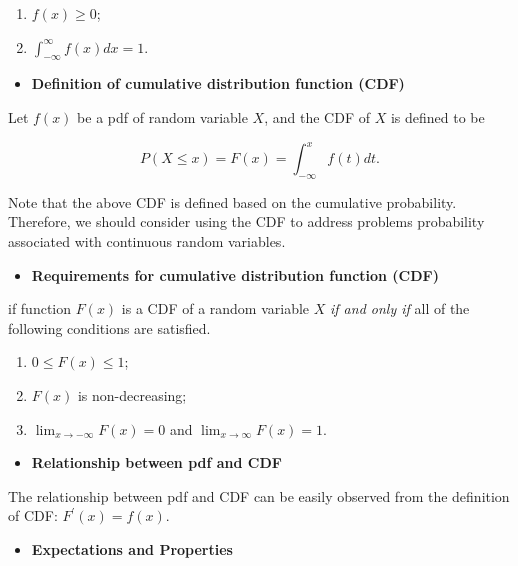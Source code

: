 \documentclass[
]{book}
\providecommand{\tightlist}{%
  \setlength{\itemsep}{0pt}\setlength{\parskip}{0pt}}
\begin{document}
\begin{enumerate}
\def\labelenumi{\arabic{enumi}.}
\item
  \(f(x) \ge 0\);
\item
  \(\int_{-\infty}^\infty f(x) dx = 1\).
\end{enumerate}

\begin{itemize}
\tightlist
\item
  \textbf{Definition of cumulative distribution function (CDF)}
\end{itemize}

Let \(f(x)\) be a pdf of random variable \(X\), and the CDF of \(X\) is defined to be

\[
P(X \le x) = F(x) = \int_{-\infty}^x f(t)dt.
\]

Note that the above CDF is defined based on the cumulative probability. Therefore, we should consider using the CDF to address problems probability associated with continuous random variables.

\hfill\break

\begin{itemize}
\tightlist
\item
  \textbf{Requirements for cumulative distribution function (CDF)}
\end{itemize}

if function \(F(x)\) is a CDF of a random variable \(X\) \emph{if and only if} all of the following conditions are satisfied.

\begin{enumerate}
\def\labelenumi{\arabic{enumi}.}
\item
  \(0 \le F(x) \le 1\);
\item
  \(F(x)\) is non-decreasing;
\item
  \(\lim_{x \to -\infty}F(x) = 0\) and \(\lim_{x \to \infty}F(x) = 1\).
\end{enumerate}

\begin{itemize}
\tightlist
\item
  \textbf{Relationship between pdf and CDF}
\end{itemize}

The relationship between pdf and CDF can be easily observed from the definition of CDF: \(F^\prime(x) = f(x)\).

\begin{itemize}
\tightlist
\item
  \textbf{Expectations and Properties}
\end{itemize}
\end{document}
